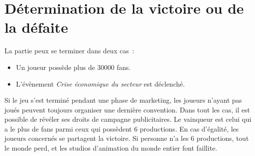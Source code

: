         \section{Détermination de la victoire ou de la défaite}

            La partie peux se terminer dans deux cas :
            \begin{itemize}
                \item Un joueur possède plus de 30000 fans.
                \item L'évènement \textit{Crise économique du secteur} est déclenché.
            \end{itemize}

            Si le jeu s'est terminé pendant une phase de marketing, les joueurs n'ayant pas joués peuvent toujours organiser une dernière convention.
            Dans tout les cas, il est possible de révéler ses droits de campagne publicitaires.\newline
            Le vainqueur est celui qui a le plus de fans parmi ceux qui possèdent 6 productions.
            En cas d'égalité, les joueurs concernés se partagent la victoire. Si personne n'a les 6 productions,
            tout le monde perd, et les studios d'animation du monde entier font faillite.